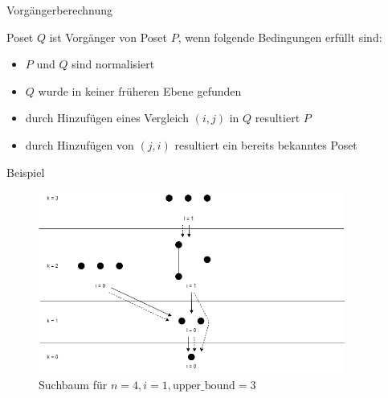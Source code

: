 \begin{frame}{Vorgängerberechnung}
  \begin{definition}[Vorgänger]
    Poset $Q$ ist Vorgänger von Poset $P$, wenn folgende Bedingungen erfüllt sind:
    \begin{itemize}
      \item<+-> $P$ und $Q$ sind normalisiert %
      \item<+-> $Q$ wurde in keiner früheren Ebene gefunden %
      \item<+-> durch Hinzufügen eines Vergleich $(i, j)$ in $Q$ resultiert $P$ %
      \item<+-> durch Hinzufügen von $(j, i)$ resultiert ein bereits bekanntes Poset %
    \end{itemize}
  \end{definition}
\end{frame}


\begin{frame}{Beispiel}

  \begin{figure}[!b]
    \centering
    \includegraphics[width=0.9\textwidth,height=0.67\textheight,keepaspectratio]{./figures/backward-searchtree-bound3.png}
    \caption{Suchbaum für $n=4,i=1,\text{upper\_bound}=3$}
    \label{fig:backward-searchtree-bound3}
  \end{figure}
\end{frame}


